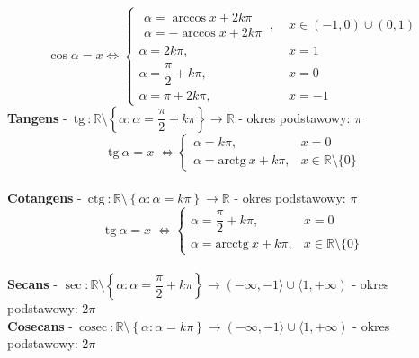 \documentclass[14pt,a4paper]{extarticle}
\newcommand{\tg}{\,\text{tg}\:}
\newcommand{\ctg}{\,\text{ctg}\:}
\newcommand{\cosec}{\,\text{cosec}\:}
\begin{document}
\begin{equation*}
   \cos\alpha = x \Leftrightarrow \left\{
      \begin{array}{ll}
         \begin{array}{l} 
         \!\!\!\!\alpha = \arccos x + 2k\pi \\
         \!\!\!\!\alpha = - \arccos x + 2k\pi
         \end{array}\:, \; & x \in (-1, 0) \cup (0, 1) \\[0.6cm]
         \alpha = 2k\pi, & x = 1 \\[0.4cm]
         \alpha = \dfrac{\pi}{2} + k\pi, & x = 0 \\[0.4cm]
         \alpha = \pi + 2k\pi, & x = -1
      \end{array}
   \right.
\end{equation*}
\newpage
\noindent\textbf{Tangens} - $\tg\!: \mathbb{R}\setminus\left\{\alpha:\alpha=\dfrac{\pi}{2} + k\pi\right\} \rightarrow \mathbb{R} $ - okres podstawowy: $\pi$
\hfill\break\\
\begin{equation*}
   \!\!\!\!\!\!\!\!\!\!\!\!\!\!\!\!\!\!\!\!\!\!\!\!\!\!\!\!\!\!\!\!\!\!\!\!\tg\alpha = x \;\Leftrightarrow \left\{
      \begin{array}{ll}
         \alpha = k\pi, & x = 0 \\[0.4cm]
         \alpha = \text{arctg}\:x + k\pi, & x \in \mathbb{R}\setminus\{0\}
      \end{array}
   \right.
\end{equation*}
\hfill\break\\
\noindent\textbf{Cotangens} - $\ctg\!: \mathbb{R}\setminus\left\{\alpha:\alpha=k\pi\right\} \rightarrow \mathbb{R} $ - okres podstawowy: $\pi$
\hfill\break\\
\begin{equation*}
   \!\!\!\!\!\!\!\!\!\!\!\!\!\!\!\!\!\!\!\!\!\!\!\!\!\!\!\!\!\!\!\!\!\!\!\!\tg\alpha = x \;\Leftrightarrow \left\{
      \begin{array}{ll}
         \alpha = \dfrac{\pi}{2} + k\pi, & x = 0 \\[0.4cm]
         \alpha = \text{arcctg}\:x + k\pi, & x \in \mathbb{R}\setminus\{0\}
      \end{array}
   \right.
\end{equation*}
\hfill\break\\
\noindent\textbf{Secans} - $\sec: \mathbb{R}\setminus\left\{\alpha:\alpha=\dfrac{\pi}{2} + k\pi\right\} \rightarrow (-\infty, -1\rangle \cup \langle 1, +\infty) $ - okres podstawowy: $2\pi$
\hfill\break\\
\noindent\textbf{Cosecans} - $\cosec: \mathbb{R}\setminus\left\{\alpha:\alpha=k\pi\right\} \rightarrow (-\infty, -1\rangle \cup \langle 1, +\infty) $ - okres podstawowy: $2\pi$
\end{document}
